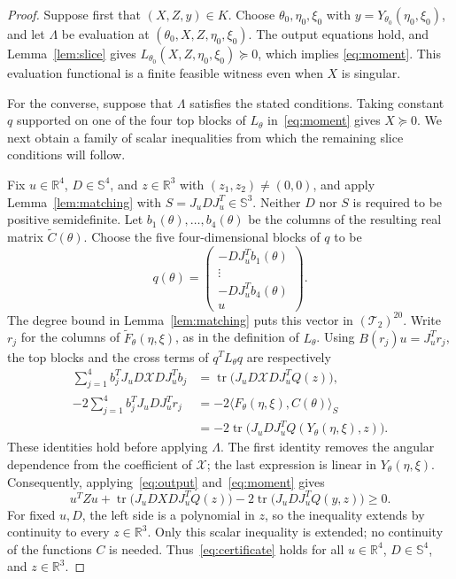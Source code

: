 \begin{proof}
Suppose first that $(X,Z,y)\in K$.  Choose
$\theta_0,\eta_0,\xi_0$ with
$y=Y_{\theta_0}(\eta_0,\xi_0)$, and let $\Lambda$ be evaluation at
$(\theta_0,X,Z,\eta_0,\xi_0)$.  The output equations hold, and
Lemma~\ref{lem:slice} gives
$L_{\theta_0}(X,Z,\eta_0,\xi_0)\succeq0$, which implies
\eqref{eq:moment}.  This evaluation functional is a finite feasible
witness even when $X$ is singular.

For the converse, suppose that $\Lambda$ satisfies the stated conditions.
Taking constant $q$ supported on one of the four top blocks of $L_\theta$
in~\eqref{eq:moment} gives $X\succeq0$.
We next obtain a family of scalar inequalities from which the remaining
slice conditions will follow.

Fix $u\in\mathbb R^4$, $D\in\mathbb S^4$, and
$z\in\mathbb R^3$ with $(z_1,z_2)\neq(0,0)$, and apply
Lemma~\ref{lem:matching} with
$S=J_uDJ_u^T\in\mathbb S^3$.  Neither $D$ nor $S$ is required to be
positive semidefinite.  Let $b_1(\theta),\ldots,b_4(\theta)$ be
the columns of the resulting real matrix $\widetilde C(\theta)$.
Choose the five four-dimensional blocks of $q$ to be
\[
  q(\theta)=
  \begin{pmatrix}
    -DJ_u^Tb_1(\theta)\\
    \vdots\\
    -DJ_u^Tb_4(\theta)\\
    u
  \end{pmatrix}.
\]
The degree bound in Lemma~\ref{lem:matching} puts this vector in
$(\mathcal T_2)^{20}$.  Write $r_j$ for the columns of
$\widetilde F_\theta(\eta,\xi)$, as in the definition of $L_\theta$.
Using $B(r_j)u=J_u^Tr_j$, the top blocks and the cross terms of
$q^TL_\theta q$ are respectively
\begin{align*}
  \sum_{j=1}^4 b_j^T J_uD\mathcal X DJ_u^Tb_j
    &=\operatorname{tr}\bigl(J_uD\mathcal X DJ_u^TQ(z)\bigr),\\
  -2\sum_{j=1}^4 b_j^TJ_uDJ_u^Tr_j
    &=-2\langle F_\theta(\eta,\xi),C(\theta)\rangle_S\\
    &=-2\operatorname{tr}\bigl(J_uDJ_u^T
        Q(Y_\theta(\eta,\xi),z)\bigr).
\end{align*}
These identities hold before applying $\Lambda$.  The first identity
removes the angular dependence from the coefficient of $\mathcal X$;
the last expression is linear in $Y_\theta(\eta,\xi)$.
Consequently, applying~\eqref{eq:output} and~\eqref{eq:moment} gives
\begin{equation}\label{eq:certificate}
  u^TZu+
  \operatorname{tr}\bigl(J_uDXDJ_u^TQ(z)\bigr)
  -2\operatorname{tr}\bigl(J_uDJ_u^TQ(y,z)\bigr)\geq0.
\end{equation}
For fixed $u,D$, the left side is a polynomial in $z$, so the inequality
extends by continuity to every $z\in\mathbb R^3$.  Only this scalar
inequality is extended; no continuity of the functions $C$ is needed.
Thus~\eqref{eq:certificate} holds for all $u\in\mathbb R^4$,
$D\in\mathbb S^4$, and $z\in\mathbb R^3$.


\end{proof}
